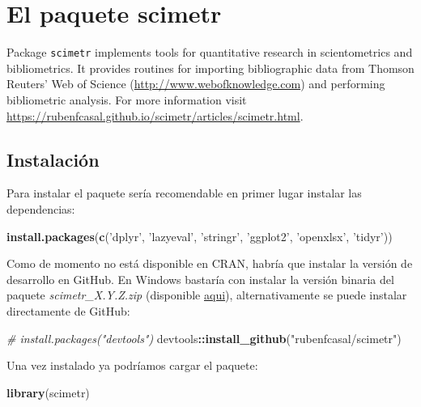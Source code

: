 \documentclass[
]{book}
\newenvironment{Shaded}{\begin{snugshade}}{\end{snugshade}}
\newcommand{\CommentTok}[1]{\textcolor[rgb]{0.56,0.35,0.01}{\textit{#1}}}
\newcommand{\KeywordTok}[1]{\textcolor[rgb]{0.13,0.29,0.53}{\textbf{#1}}}
\newcommand{\NormalTok}[1]{#1}
\newcommand{\OperatorTok}[1]{\textcolor[rgb]{0.81,0.36,0.00}{\textbf{#1}}}
\newcommand{\StringTok}[1]{\textcolor[rgb]{0.31,0.60,0.02}{#1}}
\begin{document}
\hypertarget{scimetr}{%
\chapter{El paquete scimetr}\label{scimetr}}

Package \texttt{scimetr} implements tools for quantitative research in scientometrics and bibliometrics.
It provides routines for importing bibliographic data from Thomson Reuters' Web of Science (\url{http://www.webofknowledge.com}) and performing bibliometric analysis. For more information visit \url{https://rubenfcasal.github.io/scimetr/articles/scimetr.html}.

\hypertarget{instalaciuxf3n}{%
\section{Instalación}\label{instalaciuxf3n}}

Para instalar el paquete sería recomendable en primer lugar instalar las dependencias:

\begin{Shaded}
\begin{Highlighting}[]
\KeywordTok{install.packages}\NormalTok{(}\KeywordTok{c}\NormalTok{(}\StringTok{'dplyr'}\NormalTok{, }\StringTok{'lazyeval'}\NormalTok{, }\StringTok{'stringr'}\NormalTok{, }\StringTok{'ggplot2'}\NormalTok{, }\StringTok{'openxlsx'}\NormalTok{, }\StringTok{'tidyr'}\NormalTok{))}
\end{Highlighting}
\end{Shaded}

Como de momento no está disponible en CRAN,
habría que instalar la versión de desarrollo en GitHub.
En Windows bastaría con instalar la versión binaria del paquete \emph{scimetr\_X.Y.Z.zip}
(disponible \href{https://github.com/rubenfcasal/scimetr/tree/master/docs}{aqui}),
alternativamente se puede instalar directamente de GitHub:

\begin{Shaded}
\begin{Highlighting}[]
\CommentTok{# install.packages("devtools")}
\NormalTok{devtools}\OperatorTok{::}\KeywordTok{install_github}\NormalTok{(}\StringTok{"rubenfcasal/scimetr"}\NormalTok{)}
\end{Highlighting}
\end{Shaded}

Una vez instalado ya podríamos cargar el paquete:

\begin{Shaded}
\begin{Highlighting}[]
\KeywordTok{library}\NormalTok{(scimetr)}
\end{Highlighting}
\end{Shaded}
\end{document}
